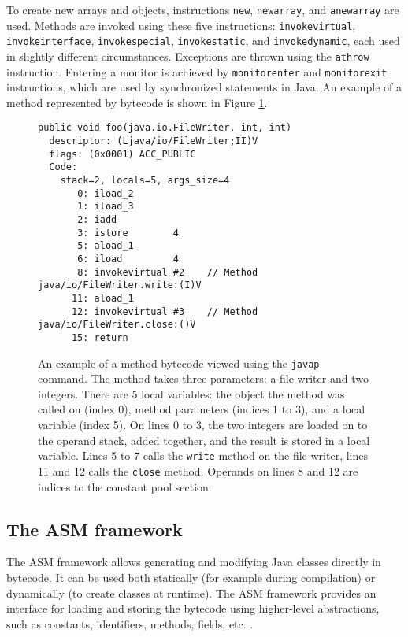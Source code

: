 To create new arrays and objects, instructions \texttt{new}, \texttt{newarray},
and \texttt{anewarray} are used. Methods are invoked using these five
instructions: \texttt{invokevirtual}, \texttt{invokeinterface},
\texttt{invokespecial}, \texttt{invokestatic}, and \texttt{invokedynamic}, each
used in slightly different circumstances. Exceptions are thrown using the
\texttt{athrow} instruction. Entering a monitor is achieved by
\texttt{monitorenter} and \texttt{monitorexit} instructions, which are used by
synchronized statements in Java. An example of a method represented by bytecode
is shown in Figure \ref{bytecodeExample}.

\begin{figure}[hbt]
    \label{bytecodeExample}
    \begin{lstlisting}
public void foo(java.io.FileWriter, int, int)
  descriptor: (Ljava/io/FileWriter;II)V
  flags: (0x0001) ACC_PUBLIC
  Code:
    stack=2, locals=5, args_size=4
       0: iload_2
       1: iload_3
       2: iadd
       3: istore        4
       5: aload_1
       6: iload         4
       8: invokevirtual #2    // Method java/io/FileWriter.write:(I)V
      11: aload_1
      12: invokevirtual #3    // Method java/io/FileWriter.close:()V
      15: return
    \end{lstlisting}
    \caption{An example of a method bytecode viewed using the \texttt{javap}
    command. The method takes three parameters: a file writer and two integers.
    There are 5 local variables: the object the method was called on (index 0),
    method parameters (indices 1 to 3), and a local variable (index 5). On lines
    0 to 3, the two integers are loaded on to the operand stack, added together,
    and the result is stored in a local variable. Lines 5 to 7 calls the
    \texttt{write} method on the file writer, lines 11 and 12 calls the
    \texttt{close} method. Operands on lines 8 and 12 are indices to the
    constant pool section.}
\end{figure}


\subsection{The ASM framework}

The ASM framework allows generating and modifying Java classes directly in
bytecode. It can be used both statically (for example during compilation) or
dynamically (to create classes at runtime). The ASM framework provides an
interface for loading and storing the bytecode using higher-level abstractions,
such as constants, identifiers, methods, fields, etc. \cite{asmguide}.

